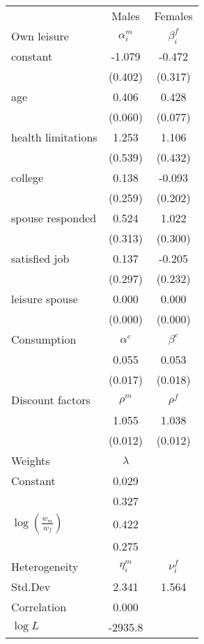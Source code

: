 \begin{tabular}{lcc} 
\hline\hline 
 & Males & Females \\ 
Own leisure & $\alpha_{i}^{m}$ & $\beta_{i}^{f}$ \\ 
constant & -1.079 & -0.472 \\ 
 & (0.402) & (0.317) \\ 
age & 0.406 & 0.428 \\ 
 & (0.060) & (0.077) \\ 
health limitations & 1.253 & 1.106 \\ 
 & (0.539) & (0.432) \\ 
college & 0.138 & -0.093 \\ 
 & (0.259) & (0.202) \\ 
spouse responded & 0.524 & 1.022 \\ 
 & (0.313) & (0.300) \\ 
satisfied job & 0.137 & -0.205 \\ 
 & (0.297) & (0.232) \\ 
leisure spouse & 0.000 & 0.000 \\ 
 & (0.000) & (0.000) \\ 
Consumption & $\alpha^{c}$ & $\beta^{c}$ \\ 
 & 0.055 & 0.053 \\ 
 & (0.017) & (0.018) \\ 
Discount factors & $\rho^m$ & $\rho^f$ \\ 
 & 1.055 & 1.038 \\ 
 & (0.012) & (0.012) \\ 
Weights & $\lambda$ &  \\ 
Constant & 0.029 &  \\ 
 & 0.327 &  \\ 
$\log(\frac{w_m}{w_f})$ & 0.422 &  \\ 
 & 0.275 &  \\ 
Heterogeneity & $\eta_i^m$ & $\nu_i^f$ \\ 
Std.Dev & 2.341 & 1.564 \\ 
Correlation & 0.000 &  \\ 
\hline 
$\log L$ & -2935.8 & \\ 
\hline \hline 
\end{tabular} 
